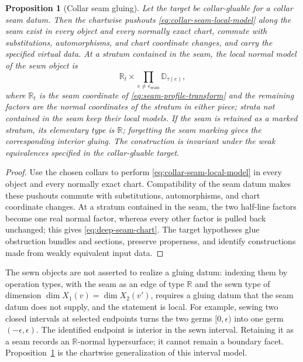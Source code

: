 \documentclass[11pt,letterpaper,twoside]{article}
\theoremstyle{plain}
\newtheorem{proposition}[theorem]{Proposition}
\theoremstyle{definition}
\theoremstyle{remark}
\begin{document}
\begin{proposition}[Collar seam gluing]\label{prop:collar-seam-gluing}
Let the target be collar-gluable for a collar seam datum.  Then the chartwise pushouts \eqref{eq:collar-seam-local-model} along the seam exist in every object and every normally exact chart, commute with substitutions, automorphisms, and chart coordinate changes, and carry the specified virtual data.  At a stratum contained in the seam, the local normal model of the sewn object is
\begin{equation}\label{eq:deep-seam-chart}
 \mathbb R_t
 \times
 \prod_{e\ne e_{\mathrm{seam}}}\mathbb D_{\tau(e)},
\end{equation}
where \(\mathbb R_t\) is the seam coordinate of \eqref{eq:seam-profile-transform} and the remaining factors are the normal coordinates of the stratum in either piece; strata not contained in the seam keep their local models.  If the seam is retained as a marked stratum, its elementary type is \(\mathbb R\); forgetting the seam marking gives the corresponding interior gluing.  The construction is invariant under the weak equivalences specified in the collar-gluable target.
\end{proposition}

\begin{proof}
Use the chosen collars to perform \eqref{eq:collar-seam-local-model} in every object and every normally exact chart.  Compatibility of the seam datum makes these pushouts commute with substitutions, automorphisms, and chart coordinate changes.  At a stratum contained in the seam, the two half-line factors become one real normal factor, whereas every other factor is pulled back unchanged; this gives \eqref{eq:deep-seam-chart}.  The target hypotheses glue obstruction bundles and sections, preserve properness, and identify constructions made from weakly equivalent input data.
\end{proof}

The sewn objects are not asserted to realize a gluing datum: indexing them by operation types, with the seam as an edge of type \(\mathbb R\) and the sewn type of dimension \(\dim X_1(v)=\dim X_2(v')\), requires a gluing datum that the seam datum does not supply, and the statement is local.  For example, sewing two closed intervals at selected endpoints turns the two germs $[0,\epsilon)$ into one germ $(-\epsilon,\epsilon)$.  The identified endpoint is interior in the sewn interval.  Retaining it as a seam records an $\mathbb R$-normal hypersurface; it cannot remain a boundary facet.  Proposition~\ref{prop:collar-seam-gluing} is the chartwise generalization of this interval model.
\end{document}

